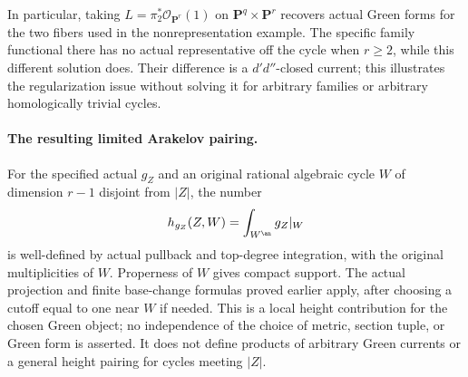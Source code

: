 In particular, taking $L=\pi_2^*\mathcal O_{\mathbf P^r}(1)$ on
$\mathbf P^q\times\mathbf P^r$ recovers actual Green forms for the two
fibers used in the nonrepresentation example.  The specific family
functional there has no actual representative off the cycle when
$r\ge2$, while this different solution does.  Their difference is a
$d'd''$-closed current; this illustrates the regularization issue without
solving it for arbitrary families or arbitrary homologically trivial
cycles.

\paragraph{The resulting limited Arakelov pairing.}
For the specified actual $g_Z$ and an original rational algebraic cycle
$W$ of dimension $r-1$ disjoint from $|Z|$, the number
\[
                       h_{g_Z}(Z,W)=\int_{W^{\an}}g_Z|_W
\]
is well-defined by actual pullback and top-degree integration, with
the original multiplicities of $W$. Properness of $W$ gives compact
support. The actual projection and finite base-change formulas proved
earlier apply, after choosing a cutoff equal to one near $W$ if needed.
This is a local height contribution for the chosen Green object; no
independence of the choice of metric, section tuple, or Green form is
asserted. It does not define products of arbitrary Green currents or
a general height pairing for cycles meeting $|Z|$.

